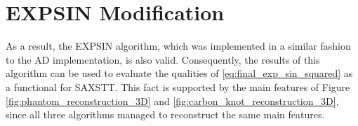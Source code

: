 \section{EXPSIN Modification}\label{sec:saxstt_validation}
As a result, the EXPSIN algorithm, which was implemented in a similar fashion to the AD implementation, is also valid.
Consequently, the results of this algorithm can be used to evaluate the qualities of \eqref{eq:final_exp_sin_squared} as a functional for SAXSTT.
This fact is supported by the main features of Figure \ref{fig:phantom_reconstruction_3D} and \ref{fig:carbon_knot_reconstruction_3D},
since all three algorithms managed to reconstruct the same main features.

